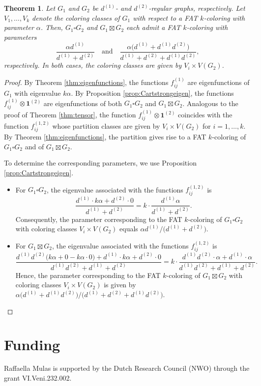 \documentclass{article}
\theoremstyle{plain}
\newtheorem{theorem}{Theorem}[section]
\theoremstyle{definition}
\theoremstyle{remark}
\begin{document}
\begin{theorem}\label{thm:Cartstrong}
    Let $G_1$ and $G_2$ be $d^{(1)}$- and $d^{(2)}$-regular graphs, respectively. 
    Let $V_1,\ldots,V_k$ denote the coloring classes of $G_1$ with respect to a FAT $k$-coloring with parameter $\alpha$. Then, $G_1\square G_2$ and $G_1 \boxtimes G_2$ each admit a FAT $k$-coloring with parameters
    \[
        \frac{\alpha d^{(1)}}{d^{(1)}+d^{(2)}} 
        \quad\text{and}\quad
        \frac{\alpha\bigl(d^{(1)} + d^{(1)}d^{(2)}\bigr)}{d^{(1)} + d^{(2)} + d^{(1)}d^{(2)}},
    \]
    respectively. In both cases, the coloring classes are given by $V_i\times V(G_2)$.
\end{theorem}
\begin{proof}
    By Theorem \ref{thm:eigenfunctions}, the functions $f_{ij}^{(1)}$ are eigenfunctions of $G_1$ with eigenvalue $k\alpha$. By Proposition \ref{prop:Cartstrongeigen}, the functions $f_{ij}^{(1)}\otimes \boldsymbol{1}^{(2)}$ are eigenfunctions of both $G_1\square G_2$ and $G_1 \boxtimes G_2$. Analogous to the proof of Theorem \ref{thm:tensor}, the function $f_{ij}^{(1)}\otimes \boldsymbol{1}^{(2)}$ coincides with the function $f_{ij}^{(1,2)}$ whose partition classes are given by $V_i\times V(G_2)$ for $i=1,\ldots,k$. By Theorem \ref{thm:eigenfunctions}, the partition gives rise to a FAT $k$-coloring of $G_1\square G_2$ and of $G_1 \boxtimes G_2$.

    To determine the corresponding parameters, we use Proposition \ref{prop:Cartstrongeigen}.
    \begin{itemize}
        \item For $G_1\square G_2$, the eigenvalue associated with the functions $f_{ij}^{(1,2)}$ is
        \[
        \frac{d^{(1)} \cdot k\alpha + d^{(2)}\cdot 0}{d^{(1)}+d^{(2)}} = k\cdot\frac{d^{(1)}\alpha}{d^{(1)}+d^{(2)}}.
        \]
        Consequently, the parameter corresponding to the FAT $k$-coloring of $G_1\square G_2$ with coloring classes $V_i\times V(G_2)$ equals $\alpha d^{(1)}/\bigl(d^{(1)}+d^{(2)}\bigr)$.
        \item For $G_1\boxtimes G_2$, the eigenvalue associated with the functions $f_{ij}^{(1,2)}$ is
        \[
        \frac{d^{(1)}d^{(2)}\bigl(k\alpha + 0 - k\alpha \cdot 0\bigr) + d^{(1)}\cdot k\alpha + d^{(2)}\cdot 0}{d^{(1)}d^{(2)}+d^{(1)}+d^{(2)}} 
        = k\cdot \frac{d^{(1)}d^{(2)}\cdot \alpha  + d^{(1)}\cdot \alpha }{d^{(1)}d^{(2)}+d^{(1)}+d^{(2)}}.
        \]
        Hence, the parameter corresponding to the FAT $k$-coloring of $G_1\boxtimes G_2$ with coloring classes $V_i\times V(G_2)$ is given by $\alpha\bigl(d^{(1)}+d^{(1)}d^{(2)}\bigr)/\bigl( d^{(1)}+d^{(2)}+d^{(1)}d^{(2)}\bigr)$.\qedhere
    \end{itemize}
\end{proof}

\section*{Funding}
Raffaella Mulas is supported by the Dutch Research Council (NWO) through the grant VI.Veni.232.002.

 

\end{document}
